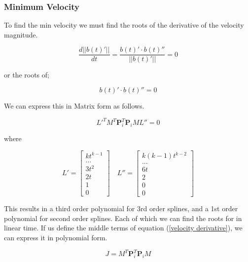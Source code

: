 \documentclass{article}
\begin{document}
\subsubsection{Minimum Velocity}

To find the min velocity we must find the roots of the derivative of the velocity magnitude.

\begin{equation}
    \frac{d ||b(t)'||}{dt} = \frac{b(t)' \cdot b(t)''}{||b(t)'||} = 0
\end{equation}

or the roots of;

\begin{equation} \label{eq:roots of velocity derivative}
    b(t)' \cdot b(t)'' = 0
\end{equation}

We can express this in Matrix form as follows.

\begin{equation} \label{velocity derivative}
    L'^T M^{T}\textbf{P}_i^{T}\textbf{P}_iML'' = 0
\end{equation}

where 

\begin{equation}
    L'=\begin{bmatrix} kt^{k-1} \\ ... \\ 3t^2 \\ 2t \\ 1 \\ 0 \end{bmatrix} \quad L''=\begin{bmatrix} k(k-1)t^{k-2} \\ ... \\ 6t \\ 2 \\ 0 \\ 0 \end{bmatrix}
\end{equation}

This results in a third order polynomial for 3rd order splines, and a 1st order polynomial for second order splines. Each of which we can find the roots for in linear time. If us define the middle terms of equation (\ref{velocity derivative}), we can express it in polynomial form.

\begin{equation}
    J = M^{T}\textbf{P}_i^{T}\textbf{P}_iM
\end{equation}
\end{document}
